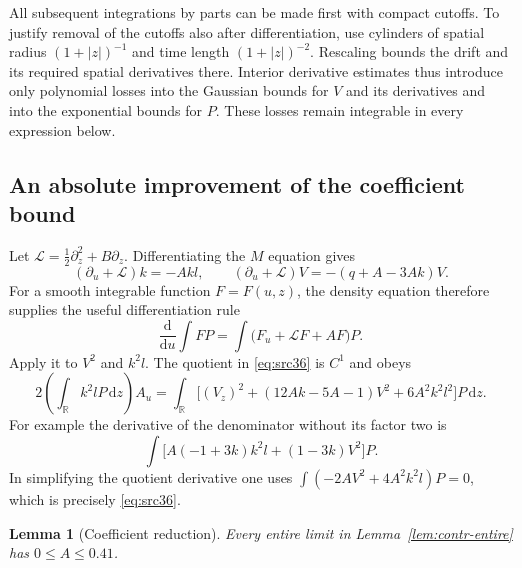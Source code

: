 \documentclass[11pt,a4paper]{article}
\numberwithin{equation}{section}
\newtheorem{lemma}[theorem]{Lemma}
\theoremstyle{definition}
\theoremstyle{remark}
\newcommand{\R}{\mathbb R}
\newcommand{\dd}{\mathrm d}
\begin{document}
All subsequent integrations by parts can be made first with compact
cutoffs.  To justify removal of the cutoffs also after differentiation,
use cylinders of spatial radius $(1+|z|)^{-1}$ and time length
$(1+|z|)^{-2}$.  Rescaling bounds the drift and its required spatial
derivatives there.  Interior derivative estimates thus introduce only
polynomial losses into the Gaussian bounds for $V$ and its derivatives
and into the exponential bounds for $P$.  These losses remain
integrable in every expression below.

\subsection{An absolute improvement of the coefficient bound}

Let $\mathcal L=\tfrac12\partial_z^2+B\partial_z$.  Differentiating the
$M$ equation gives
\[
 (\partial_u+\mathcal L)k=-Akl,
 \qquad
 (\partial_u+\mathcal L)V=-(q+A-3Ak)V.
\]
For a smooth integrable function $F=F(u,z)$, the density equation
therefore supplies the useful differentiation rule
\[
 \frac{\dd}{\dd u}\int FP
   =\int\bigl(F_u+\mathcal LF+AF\bigr)P.
\]
Apply it to $V^2$ and $k^2l$.  The quotient in \eqref{eq:src36} is
$C^1$ and obeys
\begin{equation}
 2\left(\int_\R k^2lP\,\dd z\right)A_u
 =\int_\R\bigl[(V_z)^2+(12Ak-5A-1)V^2
                    +6A^2k^2l^2\bigr]P\,\dd z.
 \label{eq:src38}
\end{equation}
For example the derivative of the denominator without its factor two
is
\[
 \int\bigl[A(-1+3k)k^2l+(1-3k)V^2\bigr]P.
\]
In simplifying the quotient derivative one uses
$\int(-2AV^2+4A^2k^2l)P=0$, which is precisely
\eqref{eq:src36}.

\begin{lemma}[Coefficient reduction]
\label{lem:contr-A}
Every entire limit in Lemma~\ref{lem:contr-entire} has $0\le A\le0.41$.
\end{lemma}
\end{document}
